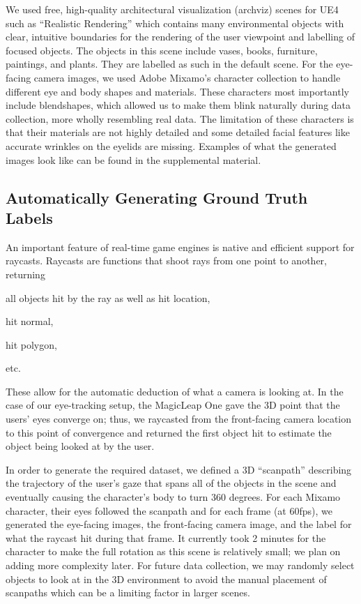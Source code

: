 We used free, high-quality architectural visualization (archviz) scenes for UE4
such as ``Realistic Rendering'' which contains many environmental objects with
clear, intuitive boundaries for the rendering of the user viewpoint and
labelling of focused objects. The objects in this scene include vases, books,
furniture, paintings, and plants. They are labelled as such in the default
scene. For the eye-facing camera images, we used Adobe Mixamo's character
collection to handle different eye and body shapes and materials. These
characters most importantly include blendshapes, which allowed us to make them
blink naturally during data collection, more wholly resembling real data. The
limitation of these characters is that their materials are not highly detailed
and some detailed facial features like accurate wrinkles on the eyelids are
missing. Examples of what the generated images look like can be found in the
supplemental material.

\subsection{Automatically Generating Ground Truth Labels}

An important feature of real-time game engines is native and efficient support
for raycasts. Raycasts are functions that shoot rays from one point to another,
returning
\begin{inlist}
\item all objects hit by the ray as well as hit location,
\item hit normal,
\item hit polygon,
\item etc.
\end{inlist}
These allow for the automatic deduction of what a camera is looking at. In the
case of our eye-tracking setup, the MagicLeap One gave the 3D point that the
users' eyes converge on; thus, we raycasted from the front-facing camera
location to this point of convergence and returned the first object hit to
estimate the object being looked at by the user.

In order to generate the required dataset, we defined a 3D ``scanpath''
describing the trajectory of the user's gaze that spans all of the objects in
the scene and eventually causing the character's body to turn 360 degrees. For
each Mixamo character, their eyes followed the scanpath and for each frame (at
60fps), we generated the eye-facing images, the front-facing camera image, and
the label for what the raycast hit during that frame. It currently took 2
minutes for the character to make the full rotation as this scene is relatively
small; we plan on adding more complexity later. For future data collection, we
may randomly select objects to look at in the 3D environment to avoid the manual
placement of scanpaths which can be a limiting factor in larger scenes.

